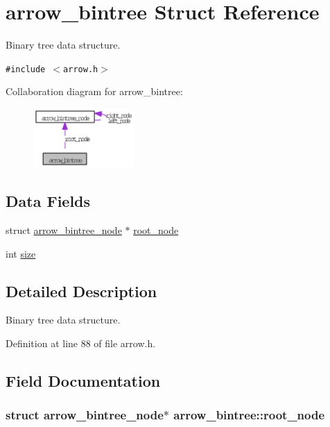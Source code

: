 \hypertarget{structarrow__bintree}{
\section{arrow\_\-bintree Struct Reference}
\label{structarrow__bintree}
}
Binary tree data structure.  


{\tt \#include $<$arrow.h$>$}

Collaboration diagram for arrow\_\-bintree:\nopagebreak
\begin{figure}[H]
\begin{center}
\leavevmode
\includegraphics[width=109pt]{structarrow__bintree__coll__graph}
\end{center}
\end{figure}
\subsection*{Data Fields}
\begin{CompactItemize}
\item 
struct \hyperlink{structarrow__bintree__node}{arrow\_\-bintree\_\-node} $\ast$ \hyperlink{structarrow__bintree_09f6d0bd6e32ae2c2f8df57a31388df6}{root\_\-node}
\item 
int \hyperlink{structarrow__bintree_7570628df0b5317cc8e240499ba12974}{size}
\end{CompactItemize}


\subsection{Detailed Description}
Binary tree data structure. 

Definition at line 88 of file arrow.h.

\subsection{Field Documentation}
\hypertarget{structarrow__bintree_09f6d0bd6e32ae2c2f8df57a31388df6}{
\subsubsection{\setlength{\rightskip}{0pt plus 5cm}struct {\bf arrow\_\-bintree\_\-node}$\ast$ {\bf arrow\_\-bintree::root\_\-node}}}
\label{structarrow__bintree_09f6d0bd6e32ae2c2f8df57a31388df6}



